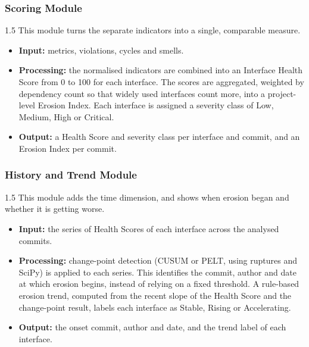 \documentclass[12pt,a4paper]{article}
\begin{document}
\subsubsection{Scoring Module}
 
\begin{spacing}{1.5}
\justifying
This module turns the separate indicators into a single, comparable measure.
 
\begin{itemize}[leftmargin=*,itemsep=2pt]
  \item \textbf{Input:} metrics, violations, cycles and smells.
  \item \textbf{Processing:} the normalised indicators are combined into an Interface Health Score from 0 to 100 for each interface. The scores are aggregated, weighted by dependency count so that widely used interfaces count more, into a project-level Erosion Index. Each interface is assigned a severity class of Low, Medium, High or Critical.
  \item \textbf{Output:} a Health Score and severity class per interface and commit, and an Erosion Index per commit.
\end{itemize}
\end{spacing}
 
\subsubsection{History and Trend Module}
 
\begin{spacing}{1.5}
\justifying
This module adds the time dimension, and shows when erosion began and whether it is getting worse.
 
\begin{itemize}[leftmargin=*,itemsep=2pt]
  \item \textbf{Input:} the series of Health Scores of each interface across the analysed commits.
  \item \textbf{Processing:} change-point detection (CUSUM or PELT, using ruptures and SciPy) is applied to each series. This identifies the commit, author and date at which erosion begins, instead of relying on a fixed threshold. A rule-based erosion trend, computed from the recent slope of the Health Score and the change-point result, labels each interface as Stable, Rising or Accelerating.
  \item \textbf{Output:} the onset commit, author and date, and the trend label of each interface.
\end{itemize}
\end{spacing}
 
\end{document}

